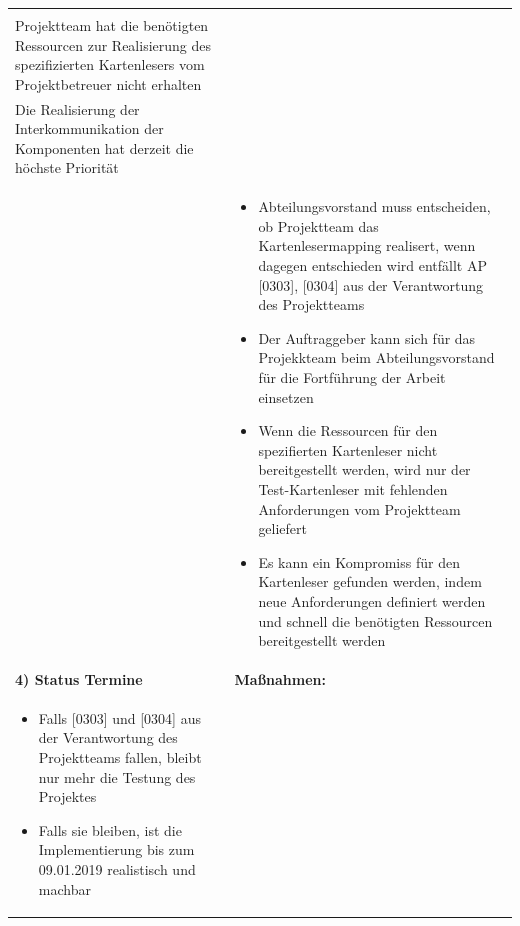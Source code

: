 \begin{center}
\begin{scriptsize}
\begin{tabularx}{\textwidth}{|p{8cm}|X|}
\begin{minipage}{.55\textwidth}
\begin{flushleft}
\begin{itemize}
             \\ Projektteam hat die benötigten Ressourcen zur Realisierung des spezifizierten Kartenlesers vom Projektbetreuer nicht erhalten
         \item \:[0305] \\
            Die Realisierung der Interkommunikation der Komponenten hat derzeit die höchste Priorität\\
            \vspace{0.2cm}
    \end{itemize}
    \end{flushleft}
    \end{minipage} &
    \begin{minipage}{.4\textwidth} 
    \begin{flushleft}
        \begin{itemize} \vspace{0}  
          \item Abteilungsvorstand muss entscheiden, ob Projektteam das Kartenlesermapping realisert, wenn dagegen entschieden wird entfällt AP [0303], [0304] aus der Verantwortung des Projektteams
          \item Der Auftraggeber kann sich für das Projekkteam beim Abteilungsvorstand für die Fortführung der Arbeit einsetzen
          \item Wenn die Ressourcen für den spezifierten Kartenleser nicht bereitgestellt werden, wird nur der Test-Kartenleser mit fehlenden Anforderungen vom Projektteam geliefert
          \item Es kann ein Kompromiss für den Kartenleser gefunden werden, indem neue Anforderungen definiert werden und schnell die benötigten Ressourcen bereitgestellt werden
          \vspace{0.2cm}  
    \end{itemize}
    \end{flushleft}
    \end{minipage} \\
    \hline
    \textbf{4) Status Termine} & \textbf{Maßnahmen:}\\
    \begin{minipage}{.56\textwidth} 
    \begin{flushleft}
        \begin{itemize} \vspace{-0.4cm}
        \item Falls [0303] und [0304] aus der Verantwortung des Projektteams fallen, bleibt nur mehr die Testung des Projektes
         \item Falls sie bleiben, ist die Implementierung bis zum 09.01.2019 realistisch und machbar

\end{itemize}
\end{flushleft}
\end{minipage}
\end{tabularx}
\end{scriptsize}
\end{center}
